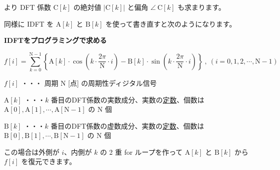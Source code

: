 \documentclass[a4paper]{jarticle}
\begin{document}
\medskip
\noindent より DFT 係数 $\textrm{C}[k]$ の絶対値 $|\textrm{C}[k]|$ と偏角 $\angle \ \textrm{C}[k]$ も求まります。

\bigskip
同様に IDFT を $\textrm{A}[k]$ と $\textrm{B}[k]$ を使って書き直すと次のようになります。

\begin{framed}
\noindent\quad \textbf{IDFTをプログラミングで求める}

\[
f[i] = \sum_{k=0}^{\textrm{N}-1}
\left \{
\textrm{A}[k] \cdot \cos( k \cdot \frac{2\pi}{\textrm{N}} \cdot i )
- 
\textrm{B}[k] \cdot \sin( k \cdot \frac{2\pi}{\textrm{N}} \cdot i )
\right \}
\ ,\  (i = 0, 1, 2, \cdots, \textrm{N}-1)
\]

\bigskip
\noindent\quad $f[i]$ ・・・ 周期 $\textrm{N}$ [点] の周期性ディジタル信号

\bigskip
\noindent\quad $\textrm{A}[k]$ ・・・$k$ 番目のDFT係数の実数成分、実数の\underline{定数}、個数は $\textrm{A}[0], \textrm{A}[1], \cdots, \textrm{A}[\textrm{N}-1]$ の $\textrm{N}$ 個 

\bigskip
\noindent\quad $\textrm{B}[k]$ ・・・$k$ 番目のDFT係数の虚数成分、実数の\underline{定数}、個数は $\textrm{B}[0], \textrm{B}[1], \cdots, \textrm{B}[\textrm{N}-1]$ の $\textrm{N}$ 個 
\end{framed}

\medskip
この場合は外側が $i$、内側が $k$ の 2 重 for ループを作って $\textrm{A}[k]$ と $\textrm{B}[k]$ から $f[i]$ を復元できます。
\end{document}

